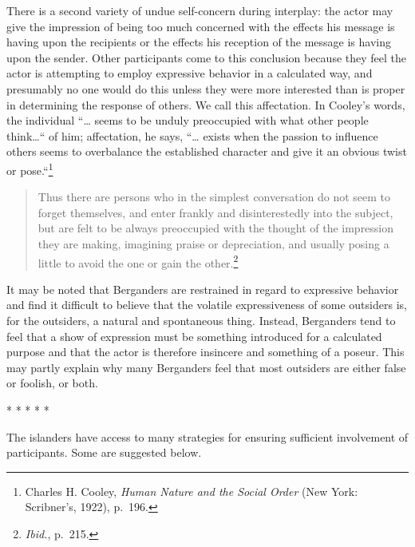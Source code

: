 \documentclass[twoside,symmetric,nobib,justified]{tufte-book}
\begin{document}
There is a second variety of undue self-concern during interplay: the
actor may give the impression of being too much concerned with the
effects his message is having upon the recipients or the effects his
reception of the message is having upon the sender. Other participants
come to this conclusion because they feel the actor is attempting to
employ expressive behavior in a calculated way, and presumably no one
would do this unless they were more interested than is proper in
determining the response of others. We call this affectation. In
Cooley's words, the individual ``\ldots{} seems to be unduly preoccupied
with what other people think\ldots`` of him; affectation, he says,
``\ldots{} exists when the passion to influence others seems to
overbalance the established character and give it an obvious twist or
pose.``\footnote{Charles H. Cooley, \emph{Human Nature and the Social
  Order} (New York: Scribner's, 1922), p.~196.}

\begin{quote}
Thus there are persons who in the simplest conversation do not seem to
forget themselves, and enter frankly and disinterestedly into the
subject, but are felt to be always preoccupied with the thought of the
impression they are making, imagining praise or depreciation, and
usually posing a little to avoid the one or gain the other.\footnote{\emph{Ibid.},
  p.~215.}
\end{quote}

\noindent It may be noted that Berganders are restrained in regard to expressive
behavior and find it difficult to believe that the volatile
expressiveness of some outsiders is, for the outsiders, a natural and
spontaneous thing. Instead, Berganders tend to feel that a show of
expression must be something introduced for a calculated purpose and
that the actor is therefore insincere and something of a poseur. This
may partly explain why many Berganders feel that most outsiders are
either false or foolish, or both.

\vspace{.2in}
\begin{centering}

\Large{* * * * *}

\end{centering}
\vspace{.17in}

\noindent The islanders have access to many strategies for ensuring sufficient
involvement of participants. Some are suggested below.
\end{document}
